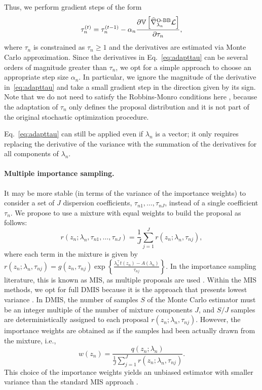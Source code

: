 \documentclass[]{article}
\begin{document}
Thus, we perform gradient steps of the form
\begin{equation}\label{eq:adapttau}
  \tau^{(t)}_{n}=\tau^{(t-1)}_{n}- \alpha_n \frac{\partial \mathbb{V}\left[\widehat{\nabla}^{\textrm{O-BB}}_{\lambda_n}\mathcal{L}\right]}{\partial \tau_{n}},
\end{equation}
where $\tau_n$ is constrained as $\tau_n\geq 1$ and the derivatives are estimated via Monte Carlo approximation. Since the derivatives in Eq.~\ref{eq:adapttau} can be several orders of magnitude greater than $\tau_{n}$, we opt for a simple approach to choose an appropriate step size $\alpha_n$. In particular, we ignore the magnitude of the derivative in~\eqref{eq:adapttau} and take a small gradient step in the direction given by its sign. Note that we do not need to satisfy the Robbins-Monro conditions here \citep{Robbins1951}, because the adaptation of $\tau_n$ only defines the proposal distribution and it is not part of the original stochastic optimization procedure.

Eq.~\ref{eq:adapttau} can still be applied even if $\lambda_n$ is a vector; it only requires replacing the derivative of the variance with the summation of the derivatives for all components of $\lambda_n$.

\paragraph{Multiple importance sampling.}
It may be more stable (in terms of the variance of the importance weights) to consider a set of $J$ dispersion coefficients, $\tau_{n1},\ldots,\tau_{nJ}$, instead of a single coefficient $\tau_n$. We propose to use a mixture with equal weights to build the proposal as follows:
\begin{equation}
	r(z_n;\lambda_n,\tau_{n1},\ldots,\tau_{nJ}) = \frac{1}{J}\sum_{j=1}^{J} r(z_n;\lambda_n,\tau_{nj}),
\end{equation}
where each term in the mixture is given by $r(z_n;\lambda_n,\tau_{nj})=g(z_n,\tau_{nj})\exp\left\{ \frac{\lambda_n^\top t(z_n)-A(\lambda_n)}{\tau_{nj}}\right\}$. In the importance sampling literature, this is known as \gls{MIS}, as multiple proposals are used \citep{Veach1995}. Within the \gls{MIS} methods, we opt for full \gls{DMIS} because it is the approach that presents lowest variance \citep{Hesterberg1995,Owen2000,Elvira2015_generalized}. In \gls{DMIS}, the number of samples $S$ of the Monte Carlo estimator must be an integer multiple of the number of mixture components $J$, and $S/J$ samples are deterministically assigned to each proposal $r(z_n;\lambda_n,\tau_{nj})$. However, the importance weights are obtained as if the samples had been actually drawn from the mixture, i.e.,
\begin{equation}\label{eq:weights_dmis}
	w(z_n) = \frac{q(z_n;\lambda_n)}{\frac{1}{J}\sum_{j=1}^{J} r(z_n;\lambda_n,\tau_{nj})}.
\end{equation}
This choice of the importance weights yields an unbiased estimator with smaller variance than the standard \gls{MIS} approach \citep{Owen2000,Elvira2015_generalized}.
\end{document}
